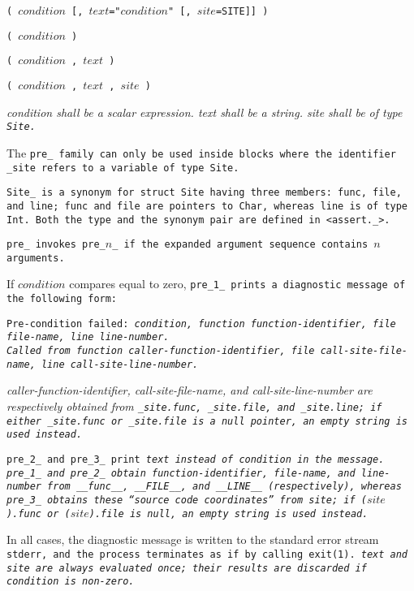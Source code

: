 
\s\s\s\tt{(} $condition$
[\tt{,} $text$\tt{="}$condition$\tt{"}
[\tt{,} $site$\tt{=SITE}]] \tt{)}

\s\tt{(} $condition$ \tt{)}

\s\tt{(} $condition$
\phantom{[}\tt{,} $text$\phantom{]} \tt{)}

\s\tt{(} $condition$
\phantom{[}\tt{,} $text$\phantom{]}
\tt{,} $site$ \tt{)}


\it{condition} shall be a scalar expression.
\it{text} shall be a string.
\it{site} shall be of type \tt{Site}.

The \tt{pre_} family can only be used inside blocks where the
identifier \tt{_site} refers to a variable of type \tt{Site}.

\note \tt{Site_} is a synonym for \tt{struct Site} having three
members: \tt{func}, \tt{file}, and \tt{line}; \tt{func} and \tt{file}
are pointers to \tt{Char}, whereas \tt{line} is of type \tt{Int}.
Both the type and the synonym pair are defined in \tt{<assert._>}.


\tt{pre_} invokes \tt{pre_}$n$\_ if the
expanded argument sequence contains $n$ arguments.

If $condition$ compares equal to zero, \tt{pre_1_}
prints a diagnostic message of the following form:

\begin{center}
\tt{Pre-condition failed:} \it{condition}\tt{, function}
\it{function-identifier}\tt{, file}
\it{file-name}\tt{, line}
\it{line-number}\tt{.}\\\indent
\tt{Called from function}
\it{caller-function-identifier}\tt{, file}
\it{call-site-file-name}\tt{, line}
\it{call-site-line-number}\tt{.}
\end{center}

\it{caller-function-identifier}, \it{call-site-file-name}, and
\it{call-site-line-number} are respectively obtained from \tt{_site.func},
\tt{_site.file}, and \tt{_site.line}; if either \tt{_site.func} or
\tt{_site.file} is a null pointer, an empty string is used instead.

\tt{pre_2_} and \tt{pre_3_} print \it{text}
instead of \it{condition} in the message.
\tt{pre_1_} and \tt{pre_2_} obtain \it{function-identifier}, \it{file-name},
and \it{line-number} from \tt{__func__}, \tt{__FILE__}, and \tt{__LINE__}
(respectively), whereas \tt{pre_3_} obtains these ``source code
coordinates'' from \it{site}; if \tt{(}$site$\tt{).func} or
\tt{(}$site$\tt{).file} is null, an empty string is used instead.

In all cases, the diagnostic message is written to the standard error stream
\tt{stderr}, and the process terminates as if by calling \tt{exit(1)}.
\it{text} and \it{site} are always evaluated once;
their results are discarded if \it{condition} is non-zero.
